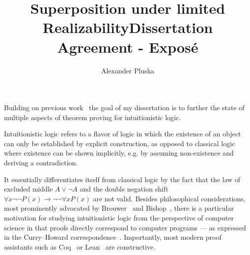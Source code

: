 \documentclass{article}
\title{Superposition under limited Realizability}
\author{Alexander Pluska}
\title{Dissertation Agreement - Exposé}
\theoremstyle{definition}
\theoremstyle{definition}
\theoremstyle{definition}
\theoremstyle{definition}
\theoremstyle{definition}
\theoremstyle{definition}
\theoremstyle{definition}
\newcommand{\0}{\mathbf 0}
\newcommand{\1}{\mathbf 1}
\begin{document}
	\maketitle
	
	Building on previous work~\cite{thesis,pluska2023embedding} the goal of my dissertation is to further the state of multiple aspects of theorem proving for intuitionistic logic.

	Intuitionistic logic refers to a flavor of logic in which the existence of an object can only be established by explicit construction, as opposed to classical logic where existence can be shown implicitly, e.g. by assuming non-existence and deriving a contradiction.

	It essentially differentiates itself from classical logic by the fact that the law of excluded middle $A\vee\neg A$ and the double negation shift $\forall x\neg\neg P(x)\to\neg\neg\forall xP(x)$ are not valid.
	Besides philosophical considerations, most prominently advocated by Brouwer~\cite{brouwer1907over} and Bishop~\cite{bishop1967foundations}, there is a particular motivation for studying intuitionistic logic from the perspective of computer science in that proofs directly correspond to computer programs --- as expressed in the Curry--Howard correspondence~\cite{howard1980formulae}. Importantly, most modern proof assistants such as Coq~\cite{bertot2013interactive} or Lean~\cite{de2015lean} are constructive.
\end{document}
